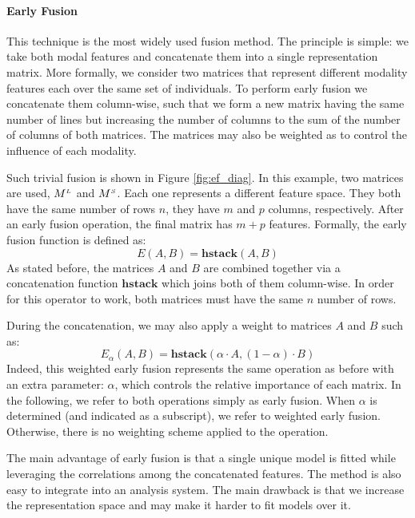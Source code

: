 \paragraph{Early Fusion} 
This technique is the most widely used fusion method. The principle is simple: we take both modal features and concatenate them into a single representation matrix. More formally, we consider two matrices  that represent different modality features each  over the same set of individuals. To perform early fusion we concatenate them column-wise, such that we form a new matrix having the same number of lines but increasing the number of columns to the sum of the number of columns of both matrices. The matrices may also be weighted as to control the influence of each modality.

Such trivial fusion  is shown in Figure \ref{fig:ef_diag}. In this example, two  matrices are used, $M^{\scriptscriptstyle L}$ and $M^{\scriptscriptstyle S}$. Each one represents a different feature space. They both have the same number of rows $n$, they have $m$ and $p$ columns, respectively. After an early fusion operation, the final matrix  has $m+p$ features. Formally, the early fusion function is defined as:
\begin{equation}
E(A,B) = \mathbf{hstack}(A , B)
\end{equation}
As stated before, the matrices $A$ and $B$ are combined together via a concatenation function $\mathbf{hstack}$ which joins both of them column-wise. In order for this operator to work, both matrices must have the same $n$ number of rows.

During the concatenation, we may also apply a weight to matrices $A$ and $B$ such as: 
\begin{equation}
E_\alpha(A,B) = \mathbf{hstack}(\alpha\cdot A , (1-\alpha)\cdot B)
\end{equation}
Indeed, this weighted early fusion  represents the same operation as before with an extra parameter: $\alpha$, which controls the relative importance of each matrix. In the following, we refer to both operations simply as early fusion. When $\alpha$ is determined (and indicated as a subscript), we refer to weighted early fusion. Otherwise, there is no weighting scheme applied to the operation.

The main advantage of early fusion is that a single unique model is fitted while leveraging the correlations among the concatenated features. The method is also easy to integrate into an analysis system. The main drawback is that we increase the representation space and may make it harder to fit models over it.

